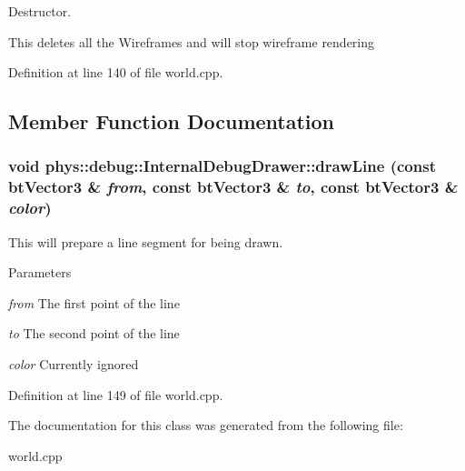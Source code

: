 Destructor. 

This deletes all the Wireframes and will stop wireframe rendering 

Definition at line 140 of file world.cpp.



\subsection{Member Function Documentation}
\hypertarget{classphys_1_1debug_1_1InternalDebugDrawer_a8a35c3c80fddaaec8e21f737ed1b3938}{
\subsubsection[{drawLine}]{\setlength{\rightskip}{0pt plus 5cm}void phys::debug::InternalDebugDrawer::drawLine (const btVector3 \& {\em from}, \/  const btVector3 \& {\em to}, \/  const btVector3 \& {\em color})}}
\label{db/d27/classphys_1_1debug_1_1InternalDebugDrawer_a8a35c3c80fddaaec8e21f737ed1b3938}


This will prepare a line segment for being drawn. 


\begin{DoxyParams}{Parameters}
\item[{\em from}]The first point of the line \item[{\em to}]The second point of the line \item[{\em color}]Currently ignored \end{DoxyParams}


Definition at line 149 of file world.cpp.



The documentation for this class was generated from the following file:\begin{DoxyCompactItemize}
\item 
world.cpp\end{DoxyCompactItemize}
